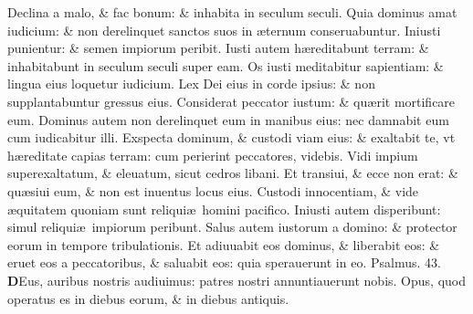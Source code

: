 \documentclass[a5paper,10pt]{book}
\def\ae{æ}
\begin{document}
\begin{multicols*}{2}
\newline \color{red} D\color{black}eclina a malo, \& fac bonum: \& inhabita in seculum seculi.
\newline \color{red} Q\color{black}uia dominus amat iudicium: \& non derelinquet sanctos suos in \ae ternum conseruabuntur.
\newline \color{red} I\color{black}niusti punientur: \& semen impiorum peribit.
\newline \color{red} I\color{black}usti autem h\ae reditabunt terram: \& inhabitabunt in seculum seculi super eam.
\newline \color{red} O\color{black}s iusti meditabitur sapientiam: \& lingua eius loquetur iudicium.
\newline \color{red} L\color{black}ex Dei eius in corde ipsius: \& non supplantabuntur gressus eius.
\newline \color{red} C\color{black}onsiderat peccator iustum: \& qu\ae rit mortificare eum.
\newline \color{red} D\color{black}ominus autem non derelinquet eum in manibus eius: nec damnabit eum cum iudicabitur illi.
\newline \color{red} E\color{black}xspecta dominum, \& custodi viam eius: \& exaltabit te, vt h\ae reditate capias terram: cum perierint peccatores, videbis.
\newline \color{red} V\color{black}idi impium superexaltatum, \& eleuatum, sicut cedros libani.
\newline \color{red} E\color{black}t transiui, \& ecce non erat: \& qu\ae siui eum, \& non est inuentus locus eius.
\newline \color{red} C\color{black}ustodi innocentiam, \& vide \ae quitatem quoniam sunt reliqui\ae \ homini pacifico.
\newline \color{red} I\color{black}niusti autem disperibunt: simul reliqui\ae \ impiorum peribunt.%
\newline \color{red} S\color{black}alus autem iustorum a domino: \& protector eorum in tempore tribulationis.
\newline \color{red} E\color{black}t adiuuabit eos dominus, \& liberabit eos: \& eruet eos a peccatoribus, \& saluabit eos: quia sperauerunt in eo.
\newline \color{red} Psalmus. 43. \color{black}
\vspace{-1em}
\lettrine[lines=2]{\bfseries \color{red} D}{}Eus, auribus nostris audiuimus: patres nostri annuntiauerunt nobis.
\newline \color{red} O\color{black}pus, quod operatus es in diebus eorum, \& in diebus antiquis.

\end{multicols*}
\end{document}
